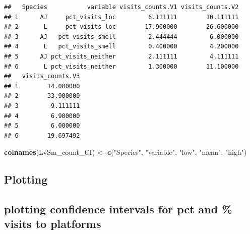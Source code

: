 \documentclass[]{article}
\newenvironment{Shaded}{\begin{snugshade}}{\end{snugshade}}
\newcommand{\KeywordTok}[1]{\textcolor[rgb]{0.13,0.29,0.53}{\textbf{{#1}}}}
\newcommand{\StringTok}[1]{\textcolor[rgb]{0.31,0.60,0.02}{{#1}}}
\newcommand{\NormalTok}[1]{{#1}}
\begin{document}
\begin{verbatim}
##   Species           variable visits_counts.V1 visits_counts.V2
## 1      AJ     pct_visits_loc         6.111111        10.111111
## 2       L     pct_visits_loc        17.900000        26.600000
## 3      AJ   pct_visits_smell         2.444444         6.000000
## 4       L   pct_visits_smell         0.400000         4.200000
## 5      AJ pct_visits_neither         2.111111         4.111111
## 6       L pct_visits_neither         1.300000        11.100000
##   visits_counts.V3
## 1        14.000000
## 2        33.900000
## 3         9.111111
## 4         6.900000
## 5         6.000000
## 6        19.697492
\end{verbatim}

\begin{Shaded}
\begin{Highlighting}[]
\KeywordTok{colnames}\NormalTok{(LvSm_count_CI) <-}\StringTok{ }\KeywordTok{c}\NormalTok{(}\StringTok{"Species"}\NormalTok{, }\StringTok{"variable"}\NormalTok{, }\StringTok{"low"}\NormalTok{, }\StringTok{"mean"}\NormalTok{, }\StringTok{"high"}\NormalTok{)}
\end{Highlighting}
\end{Shaded}

\subsection{Plotting}\label{plotting-1}

\subsection{plotting confidence intervals for pct and \% visits to
platforms}\label{plotting-confidence-intervals-for-pct-and-visits-to-platforms}
\end{document}
